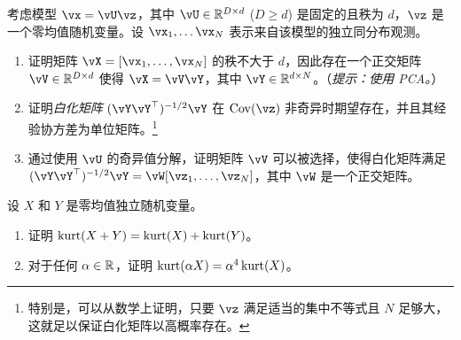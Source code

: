\documentclass[../../book-main.tex]{subfiles}
\begin{document}
\begin{exercise}\label{exercise:whitening}
    考虑模型 $\vx = \vU \vz$，其中 $\vU \in \R^{D \times d}$ ($D \geq d$) 是固定的且秩为 $d$，$\vz$ 是一个零均值随机变量。设 $\vx_1, \dots \vx_N$ 表示来自该模型的独立同分布观测。
    \begin{enumerate}
        \item 证明矩阵 $\vX = [\vx_1, \dots, \vx_N]$ 的秩不大于 $d$，因此存在一个正交矩阵 $\vV \in \R^{D \times d}$ 使得 $\vX = \vV \vY$，其中 $\vY \in \R^{d \times N}$。（\textit{提示：使用 PCA。}）
        \item 证明\textit{白化矩阵} $(\vY \vY^\top)^{-1/2}\vY$ 在 $\Cov(\vz)$ 非奇异时期望存在，并且其经验协方差为单位矩阵。\footnote{特别是，可以从数学上证明，只要 $\vz$ 满足适当的集中不等式且 $N$ 足够大，这就足以保证白化矩阵以高概率存在。}
        \item 通过使用 $\vU$ 的奇异值分解，证明矩阵 $\vV$ 可以被选择，使得白化矩阵满足 $(\vY \vY^\top)^{-1/2} \vY = \vW [\vz_1, \dots, \vz_N]$，其中 $\vW$ 是一个正交矩阵。
    \end{enumerate}
\end{exercise}

\begin{exercise}\label{exercise:kurtosis-linearity-properties}
    设 $X$ 和 $Y$ 是零均值独立随机变量。
    \begin{enumerate}
        \item 证明 $\mathop{\mathrm{kurt}}(X + Y) = \mathop{\mathrm{kurt}}(X) + \mathop{\mathrm{kurt}}(Y)$。
        \item 对于任何 $\alpha \in \mathbb{R}$，证明 $\mathop{\mathrm{kurt}}(\alpha X) = \alpha^4 \mathop{\mathrm{kurt}}(X)$。
    \end{enumerate}
\end{exercise}
\end{document}
